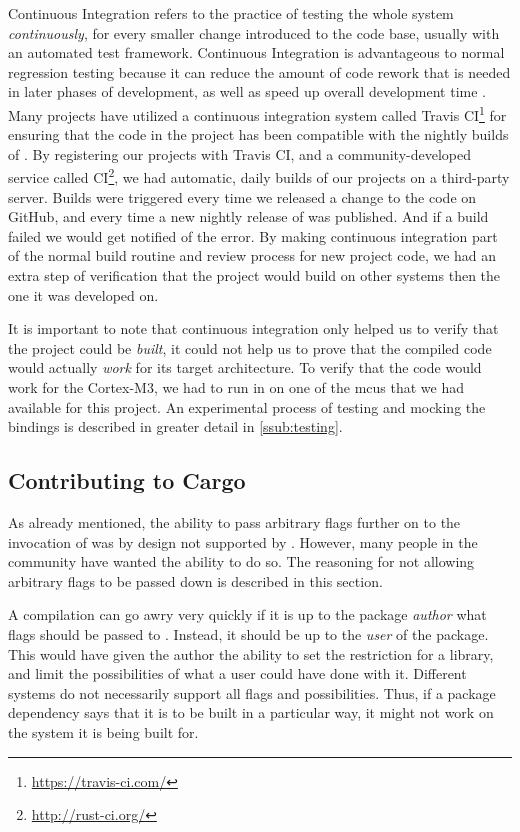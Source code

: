 Continuous Integration refers to the practice of testing the whole system \emph{continuously}, for every smaller change introduced to the code base, usually with an automated test framework.
Continuous Integration is advantageous to normal regression testing because it can reduce the amount of code rework that is needed in later phases of development, as well as speed up overall development time  \cite{Orso2014}.
Many {\rust} projects have utilized a continuous integration system called Travis CI\footnote{\url{https://travis-ci.com/}} for ensuring that the code in the project has been compatible with the nightly builds of {\rust}.
By registering our projects with Travis CI, and a community-developed service called {\rust} CI\footnote{\url{http://rust-ci.org/}}, we had automatic, daily builds of our projects on a third-party server.
Builds were triggered every time we released a change to the code on GitHub, and every time a new nightly release of {\rust} was published.
And if a build failed we would get notified of the error.
By making continuous integration part of the normal build routine and review process for new project code, we had an extra step of verification that the project would build on other systems then the one it was developed on.

It is important to note that continuous integration only helped us to verify that the project could be \emph{built}, it could not help us to prove that the compiled code would actually \emph{work} for its target architecture.
To verify that the code would work for the Cortex-M3, we had to run in on one of the \glspl{mcu} that we had available for this project.
An experimental process of testing and mocking the {\rg} bindings is described in greater detail in \autoref{ssub:testing}.

\subsection{Contributing to Cargo}
\label{ssub:contributing_to_cargo}

As already mentioned, the ability to pass arbitrary flags further on to the invocation of {\rustc} was by design not supported by {\cargo}.
However, many people in the {\rust} community have wanted the ability to do so.
The reasoning for not allowing arbitrary flags to be passed down is described in this section.

A compilation can go awry very quickly if it is up to the package \emph{author} what flags should be passed to {\rustc}.
Instead, it should be up to the \emph{user} of the package.
This would have given the author the ability to set the restriction for a library, and limit the possibilities of what a user could have done with it.
Different systems do not necessarily support all flags and possibilities.
Thus, if a package dependency says that it is to be built in a particular way, it might not work on the system it is being built for.


